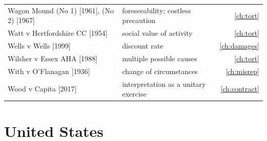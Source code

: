 \begin{longtable}{>{\raggedright\arraybackslash}p{3.7cm} >{\raggedright\arraybackslash}p{5.6cm} r}
Wagon Mound (No 1) [1961], (No 2) [1967] & foreseeability; costless precaution & \ref{ch:tort}\\
Watt v Hertfordshire CC [1954] & social value of activity & \ref{ch:tort}\\
Wells v Wells [1999] & discount rate & \ref{ch:damages}\\
Wilsher v Essex AHA [1988] & multiple possible causes & \ref{ch:tort}\\
With v O'Flanagan [1936] & change of circumstances & \ref{ch:misrep}\\
Wood v Capita [2017] & interpretation as a unitary exercise & \ref{ch:contract}\\
\bottomrule
\end{longtable}

\section*{United States}
